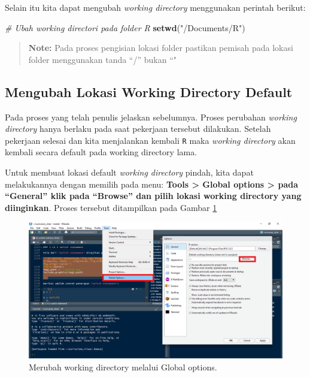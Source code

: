 \documentclass[]{book}
\newenvironment{Shaded}{\begin{snugshade}}{\end{snugshade}}
\newcommand{\KeywordTok}[1]{\textcolor[rgb]{0.13,0.29,0.53}{\textbf{#1}}}
\newcommand{\StringTok}[1]{\textcolor[rgb]{0.31,0.60,0.02}{#1}}
\newcommand{\CommentTok}[1]{\textcolor[rgb]{0.56,0.35,0.01}{\textit{#1}}}
\newcommand{\NormalTok}[1]{#1}
\begin{document}
Selain itu kita dapat mengubah \emph{working directory} menggunakan
perintah berikut:

\begin{Shaded}
\begin{Highlighting}[]
\CommentTok{# Ubah working directori pada folder R}
\KeywordTok{setwd}\NormalTok{(}\StringTok{"/Documents/R"}\NormalTok{)}
\end{Highlighting}
\end{Shaded}

\begin{quote}
\textbf{Note: } Pada proses pengisian lokasi folder pastikan pemisah
pada lokasi folder menggunakan tanda ``/'' bukan ``"
\end{quote}

\subsection{Mengubah Lokasi Working Directory
Default}\label{mengubah-lokasi-working-directory-default}

Pada proses yang telah penulis jelaskan sebelumnya. Proses perubahan
\emph{working directory} hanya berlaku pada saat pekerjaan tersebut
dilakukan. Setelah pekerjaan selesai dan kita menjalankan kembali
\texttt{R} maka \emph{working directory} akan kembali secara default
pada working directory lama.

Untuk membuat lokasi default \emph{working directory} pindah, kita dapat
melakukannya dengan memilih pada menu: \textbf{Tools \textgreater{}
Global options \textgreater{} pada ``General'' klik pada ``Browse'' dan
pilih lokasi working directory yang diinginkan}. Proses tersebut
ditampilkan pada Gambar \ref{fig:default}

\begin{figure}

{\centering \includegraphics[width=0.8\linewidth]{default} 

}

\caption{Merubah working directory melalui Global options.}\label{fig:default}
\end{figure}
\end{document}
